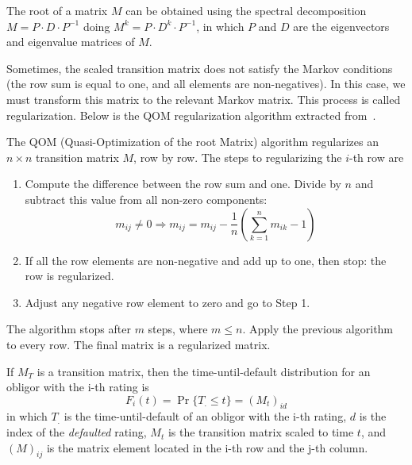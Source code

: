 \documentclass[11pt,fleqn]{book} %
\begin{document}
The root of a matrix $M$ can be obtained using the spectral decomposition
$M = P \cdot D \cdot P^{-1}$ doing $M^{k} = P \cdot D^{k} \cdot P^{-1}$, 
in which $P$ and $D$ are the eigenvectors and eigenvalue matrices of $M$. 

Sometimes, the scaled transition matrix does not satisfy the Markov conditions
(the row sum is equal to one, and all elements are non-negatives). In this case, 
we must transform this matrix to the relevant Markov matrix. This process is 
called regularization. Below is the QOM regularization algorithm extracted 
from~\cite{kreinin:2001}.

\begin{algorithm}
	The QOM (Quasi-Optimization of the root Matrix) algorithm regularizes an 
	$n {\times} n$ transition matrix $M$, row by row. The steps to 
	regularizing the $i$-th row are
	\begin{enumerate}
		\item Compute the difference between the row sum and one. 
		Divide by $n$ and subtract this value from all non-zero components:
		\begin{displaymath}
			m_{ij} \ne 0 
			\Longrightarrow 
			m_{ij} = m_{ij} - \frac{1}{n} \left( \sum_{k=1}^{n} m_{ik} - 1\right)
		\end{displaymath}
		\item If all the row elements are non-negative and add up to one, 
		then stop: the row is regularized.
		\item Adjust any negative row element to zero and go to Step 1.
	\end{enumerate}
	The algorithm stops after $m$ steps, where $m \le n$. 
	Apply the previous algorithm to every row.
	The final matrix is a regularized matrix. 
\end{algorithm}

\begin{proposition}
	\label{prop:pdftm}
	If $M_T$ is a transition matrix, then the time-until-default distribution 
	for an obligor with the i-th rating is
	\begin{displaymath}
		F_i(t) = \Pr\{T_. \le t\} = \left( M_t \right)_{id}
	\end{displaymath}
	in which $T_.$ is the time-until-default of an obligor with the i-th rating, 
	$d$ is the index of the \emph{defaulted} rating, $M_t$ is the transition 
	matrix scaled to time $t$, and $(M)_{ij}$ is the matrix element located in 
	the i-th row and the j-th column.
\end{proposition}
\end{document}
